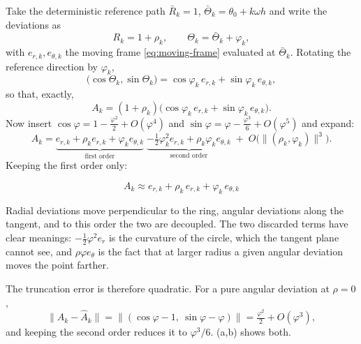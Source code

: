 \documentclass[11pt,a4paper]{article}
\newcommand{\ohat}{\widehat}
\begin{document}
Take the deterministic reference path $\bar R_k=1$, $\bar\Theta_k=\theta_0+k\omega h$ and write
the deviations as
\begin{equation}
 R_k=1+\rho_k,\qquad \Theta_k=\bar\Theta_k+\varphi_k ,
\end{equation}
with $e_{r,k},e_{\theta,k}$ the moving frame \eqref{eq:moving-frame} evaluated at
$\bar\Theta_k$. Rotating the reference direction by $\varphi_k$,
\begin{equation}
 \big(\cos\Theta_k,\sin\Theta_k\big)
 =\cos\varphi_k\,e_{r,k}+\sin\varphi_k\,e_{\theta,k} ,
\end{equation}
so that, exactly,
\begin{equation}
 A_k=(1+\rho_k)\big(\cos\varphi_k\,e_{r,k}+\sin\varphi_k\,e_{\theta,k}\big).
 \label{eq:taylor-exact}
\end{equation}
Now insert $\cos\varphi=1-\tfrac{\varphi^2}{2}+O(\varphi^4)$ and
$\sin\varphi=\varphi-\tfrac{\varphi^3}{6}+O(\varphi^5)$ and expand:
\begin{equation}
 A_k=\underbrace{e_{r,k}+\rho_k e_{r,k}+\varphi_k e_{\theta,k}}_{\text{first order}}
 \;\underbrace{-\tfrac12\varphi_k^2e_{r,k}+\rho_k\varphi_ke_{\theta,k}}_{\text{second order}}
 \;+\;O\big(\|(\rho_k,\varphi_k)\|^3\big).
 \label{eq:taylor-full}
\end{equation}
Keeping the first order only:

\begin{keyresult}
\begin{equation}
 \boxed{\;A_k\approx e_{r,k}+\rho_k\,e_{r,k}+\varphi_k\,e_{\theta,k}\;}
 \label{eq:taylor-first}
\end{equation}
\end{keyresult}

Radial deviations move perpendicular to the ring, angular deviations along the tangent, and to
this order the two are decoupled. The two discarded terms have clear meanings: $-\tfrac12
\varphi^2e_r$ is the curvature of the circle, which the tangent plane cannot see, and
$\rho\varphi e_\theta$ is the fact that at larger radius a given angular deviation moves the
point farther.

The truncation error is therefore quadratic. For a pure angular deviation at $\rho=0$,
\begin{equation}
 \big\|A_k-\ohat A_k\big\|
 =\big\|(\cos\varphi-1,\ \sin\varphi-\varphi)\big\|
 =\tfrac{\varphi^2}{2}+O(\varphi^3),
 \label{eq:taylor-error}
\end{equation}
and keeping the second order reduces it to $\varphi^3/6$.
(a,b) shows both.
\end{document}
